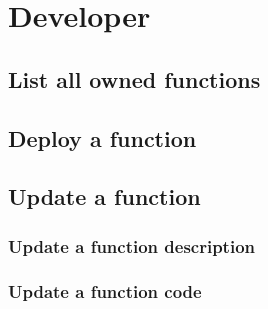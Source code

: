 \section{Developer}

\subsection{List all owned functions}

\subsection{Deploy a function}

\subsection{Update a function}

\subsubsection{Update a function description}

\subsubsection{Update a function code}
